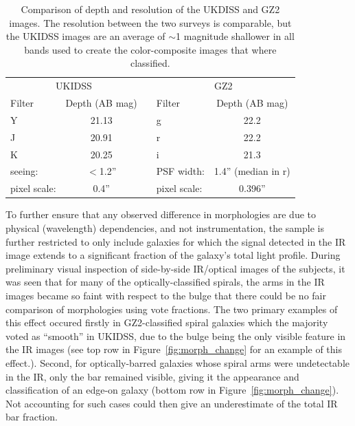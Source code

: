 \begin{center}
\begin{table}
\begin{tabular}{lcclc}
\hline \hline
\multicolumn{2}{c}{UKIDSS} & & \multicolumn{2}{c}{GZ2} \\
\cline{1-2}\cline{4-5}
Filter & Depth (AB mag) & & Filter & Depth (AB mag) \\

Y      & 21.13 & & g      & 22.2 \\
J      & 20.91 & & r      & 22.2 \\
K      & 20.25  & & i      & 21.3 \\
\cline{1-2}\cline{4-5}
seeing: & $<$1.2'' & & PSF width: & 1.4'' (median in r) \\
pixel scale: & 0.4'' & & pixel scale: & 0.396'' \\
\hline \hline
\end{tabular}
\caption{Comparison of depth and resolution of the UKDISS and GZ2 images. The resolution between the two surveys is comparable, but the UKIDSS images are an average of $\sim$1 magnitude shallower in all bands used to create the color-composite images that where classified. }
\label{tab:uk_gz2_instrumentation}
\end{table}
\end{center}

To further ensure that any observed difference in morphologies are due to physical (wavelength) dependencies, and not instrumentation, the sample is further restricted to only include galaxies for which the signal detected in the IR image extends to a significant fraction of the galaxy's total light profile. During preliminary visual inspection of side-by-side IR/optical images of the subjects, it was seen that for many of the optically-classified spirals, the arms in the IR images became so faint with respect to the bulge that there could be no fair comparison of morphologies using vote fractions. The two primary examples of this effect occured firstly in GZ2-classified spiral galaxies which the majority voted as ``smooth'' in UKIDSS, due to the bulge being the only visible feature in the IR images (see top row in Figure~\ref{fig:morph_change} for an example of this effect.). Second, for optically-barred galaxies whose spiral arms were undetectable in the IR, only the bar remained visible, giving it the appearance and classification of an edge-on galaxy (bottom row in Figure~\ref{fig:morph_change}). Not accounting for such cases could then give an underestimate of the total IR bar fraction.  

